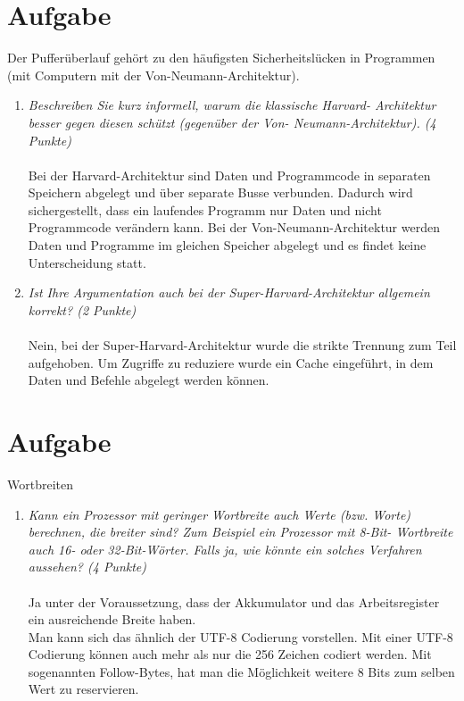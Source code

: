 \documentclass[10pt]{article}
\begin{document}
\section{Aufgabe}
Der Pufferüberlauf gehört zu den häufigsten Sicherheitslücken in Programmen (mit Computern mit der Von-Neumann-Architektur).
\begin{enumerate}[label=\alph*)]
	\item 
	\textit{Beschreiben Sie kurz informell, warum die klassische Harvard- Architektur besser gegen diesen schützt (gegenüber der Von- Neumann-Architektur). (4 Punkte)} \\
	\\	
	Bei der Harvard-Architektur sind Daten und Programmcode in separaten Speichern abgelegt und über separate Busse verbunden. Dadurch wird sichergestellt, dass ein laufendes Programm nur Daten und nicht Programmcode verändern kann. Bei der Von-Neumann-Architektur werden Daten und Programme im gleichen Speicher abgelegt und es findet keine Unterscheidung statt.
	\item
	\textit{Ist Ihre Argumentation auch bei der Super-Harvard-Architektur allgemein korrekt? (2 Punkte)} \\
	\\
	Nein, bei der Super-Harvard-Architektur wurde die strikte Trennung zum Teil aufgehoben. Um Zugriffe zu reduziere wurde ein Cache eingeführt, in dem
	Daten und Befehle abgelegt werden können.
	
\end{enumerate}


\section{Aufgabe}
Wortbreiten
\begin{enumerate}[label=\alph*)]
	\item 
	\textit{Kann ein Prozessor mit geringer Wortbreite auch Werte (bzw. Worte) berechnen, die breiter sind? Zum Beispiel ein Prozessor mit 8-Bit- Wortbreite auch 16- oder 32-Bit-Wörter. Falls ja, wie könnte ein solches Verfahren aussehen? (4 Punkte)} \\
	\\
	Ja unter der Voraussetzung, dass der Akkumulator und das Arbeitsregister ein ausreichende Breite haben.\\
	Man kann sich das ähnlich der UTF-8 Codierung vorstellen. Mit einer UTF-8 Codierung können auch mehr als nur die 256 Zeichen codiert werden. Mit sogenannten Follow-Bytes, hat man die Möglichkeit weitere 8 Bits zum selben Wert zu reservieren.
\end{enumerate}
\newpage
\end{document}
